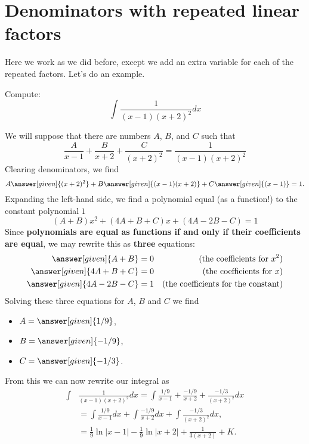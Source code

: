 \documentclass{ximera}
\begin{document}
\section{Denominators with repeated linear factors}

Here we work as we did before, except we add an extra variable for
each of the repeated factors. Let's do an example.

\begin{example}
  Compute:
  \[
  \int \frac{1}{(x-1)(x+2)^2} dx
  \]
  \begin{explanation}
    We will suppose that there are numbers $A$, $B$, and $C$ such that
    \[
    \frac{A}{x-1} + \frac{B}{x+2} + \frac{C}{(x+2)^2} = \frac{1}{(x-1)(x+2)^2}
    \]
    Clearing denominators, we find
    \[
    A\answer[given]{(x+2)^2} + B\answer[given]{(x-1)(x+2)} + C\answer[given]{(x-1)} = 1.
    \]
    Expanding the left-hand side, we find a polynomial equal (as a
    function!) to the constant polynomial $1$
    \[
    (A+B)x^2 + (4A+B+C)x + (4A-2B-C) = 1
    \]
    Since \textbf{polynomials are equal as functions if and only if
      their coefficients are equal}, we may rewrite this as
    \textbf{three} equations:
    \begin{align*}
      \answer[given]{A+B} &= 0 &\text{(the coefficients for $x^2$)}\\
      \answer[given]{4A+B+C} &= 0 &\text{(the coefficients for $x$)}\\
      \answer[given]{4A-2B-C} &= 1 &\text{(the coefficients for the constant)}
    \end{align*}
    Solving these three equations for $A$, $B$ and $C$ we find
    \begin{itemize}
    \item $A = \answer[given]{1/9}$,
    \item $B = \answer[given]{-1/9}$,
    \item $C = \answer[given]{-1/3}$.
    \end{itemize}
    From this we can now rewrite our integral as
    \begin{align*}
      \int&\frac{1}{(x-1)(x+2)^2}dx= \int \frac{1/9}{x-1}+ \frac{-1/9}{x+2} + \frac{-1/3}{(x+2)^2}dx\\
      &= \int \frac{1/9}{x-1}dx + \int \frac{-1/9}{x+2}dx + \int \frac{-1/3}{(x+2)^2}dx,\\
      &= \frac{1}{9}\ln|x-1| -\frac{1}{9}\ln|x+2| +\frac{1}{3(x+2)}+K.
    \end{align*}
  \end{explanation}
\end{example}
\end{document}
